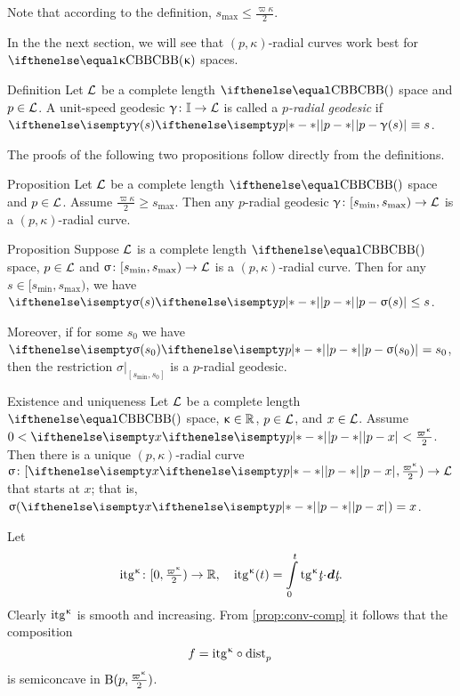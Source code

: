 Note that according to the definition, $s_{\max}\le\tfrac{\varpi\kappa}2$.

In the the next section, we will see that  $(p,\kappa)$-radial curves 
work best for $\Alex\kappa$ spaces.



\begin{thm}{Definition}\label{def:rad-geod}
Let $\mathcal{L}$ be a complete length $\Alex{}$ space
and $p\in\spc{L}$.
A unit-speed geodesic  $\gamma\:\II\to \spc{L}$  is called a
\emph{$p$-radial geodesic} if 
$\dist{p}{\gamma(s)}{}\equiv s$.
\end{thm}

The proofs of the following two propositions follow directly from the definitions. 

\begin{thm}{Proposition}\label{prop:rad-geod}
Let $\mathcal{L}$ be a complete length $\Alex{}$ space
and $p\in\spc{L}$.
Assume $\tfrac{\varpi\kappa}{2}
\ge 
s_{\max}$.
Then any $p$-radial geodesic 
$\gamma\:[s_{\min},s_{\max})
\to 
\spc{L}$ 
is a $(p,\kappa)$-radial curve.
\end{thm}

\begin{thm}{Proposition}\label{prop:dist<s}
Suppose $\mathcal{L}$ is a complete length $\Alex{}$ space, 
$p\in\spc{L}$ 
and $\sigma\:[s_{\min},s_{\max})\to \spc{L}$ is a $(p,\kappa)$-radial curve.
Then for any $s\in [s_{\min},s_{\max})$, 
we have $\dist{p}{\sigma(s)}{}\le s$.

Moreover, 
if for some $s_0$ we have $\dist{p}{\sigma(s_0)}{}= s_0$, 
then the restriction $\sigma|_{[s_{\min},s_0]}$ is a $p$-radial geodesic.
\end{thm}

\begin{thm}{Existence and uniqueness}\label{rad-curv-exist}
Let $\mathcal{L}$ be a complete length $\Alex{}$ space, 
$\kappa\in\RR$, 
$p\in\spc{L}$, 
and $x\in \spc{L}$.
Assume
$0
<
\dist{p}{x}{}
<
\tfrac{\varpi\kappa}2$.
Then there is a unique $(p,\kappa)$-radial curve $\sigma\:[\dist{p}{x}{},\tfrac{\varpi\kappa}2)\to \spc{L}$ 
that starts at $x$;
that is, $\sigma(\dist{p}{x}{})=x$.
\end{thm}


Let \index{$\itg\kappa$} 
\[\itg\kappa\:[0,\tfrac{\varpi\kappa}2)\to\RR,
\quad 
\itg\kappa (t)=\int\limits_0^t\tg\kappa\under t\cdot\dd\under t.\]
Clearly $\itg\kappa$ is smooth and increasing.
From \ref{prop:conv-comp} it follows that the composition 
\[f=\itg\kappa\circ\distfun{p}{}{}\] 
is semiconcave in $\oBall(p,\tfrac{\varpi\kappa}2)$.

